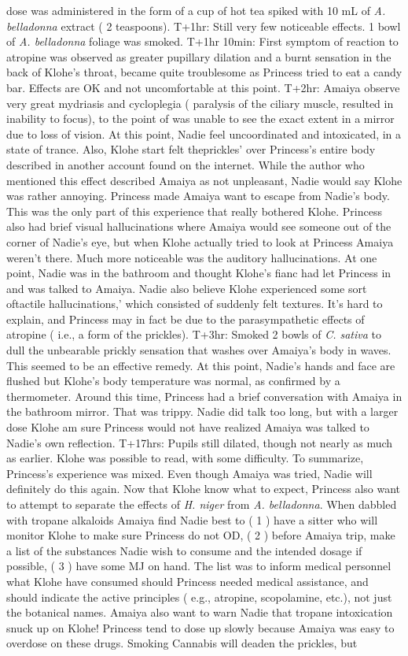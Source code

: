 \documentclass[12pt]{book}
\begin{document}
dose was administered in the form of a cup of hot tea spiked with 10 mL of \emph{A. belladonna} extract ( 2 teaspoons). T+1hr: Still very few noticeable effects. 1 bowl of \emph{A. belladonna} foliage was smoked. T+1hr 10min: First symptom of reaction to atropine was observed as greater pupillary dilation and a burnt sensation in the back of Klohe's throat, became quite troublesome as Princess tried to eat a candy bar. Effects are OK and not uncomfortable at this point. T+2hr: Amaiya observe very great mydriasis and cycloplegia ( paralysis of the ciliary muscle, resulted in inability to focus), to the point of was unable to see the exact extent in a mirror due to loss of vision. At this point, Nadie feel uncoordinated and intoxicated, in a state of trance. Also, Klohe start felt theprickles' over Princess's entire body described in another account found on the internet. While the author who mentioned this effect described Amaiya as not unpleasant, Nadie would say Klohe was rather annoying. Princess made Amaiya want to escape from Nadie's body. This was the only part of this experience that really bothered Klohe. Princess also had brief visual hallucinations where Amaiya would see someone out of the corner of Nadie's eye, but when Klohe actually tried to look at Princess Amaiya weren't there. Much more noticeable was the auditory hallucinations. At one point, Nadie was in the bathroom and thought Klohe's fianc had let Princess in and was talked to Amaiya. Nadie also believe Klohe experienced some sort oftactile hallucinations,' which consisted of suddenly felt textures. It's hard to explain, and Princess may in fact be due to the parasympathetic effects of atropine ( i.e., a form of the prickles). T+3hr: Smoked 2 bowls of \emph{C. sativa} to dull the unbearable prickly sensation that washes over Amaiya's body in waves. This seemed to be an effective remedy. At this point, Nadie's hands and face are flushed but Klohe's body temperature was normal, as confirmed by a thermometer. Around this time, Princess had a brief conversation with Amaiya in the bathroom mirror. That was trippy. Nadie did talk too long, but with a larger dose Klohe am sure Princess would not have realized Amaiya was talked to Nadie's own reflection. T+17hrs: Pupils still dilated, though not nearly as much as earlier. Klohe was possible to read, with some difficulty. To summarize, Princess's experience was mixed. Even though Amaiya was tried, Nadie will definitely do this again. Now that Klohe know what to expect, Princess also want to attempt to separate the effects of \emph{H. niger} from \emph{A. belladonna}. When dabbled with tropane alkaloids Amaiya find Nadie best to ( 1 ) have a sitter who will monitor Klohe to make sure Princess do not OD, ( 2 ) before Amaiya trip, make a list of the substances Nadie wish to consume and the intended dosage if possible, ( 3 ) have some MJ on hand. The list was to inform medical personnel what Klohe have consumed should Princess needed medical assistance, and should indicate the active principles ( e.g., atropine, scopolamine, etc.), not just the botanical names. Amaiya also want to warn Nadie that tropane intoxication snuck up on Klohe! Princess tend to dose up slowly because Amaiya was easy to overdose on these drugs. Smoking Cannabis will deaden the prickles, but 
\end{document}
